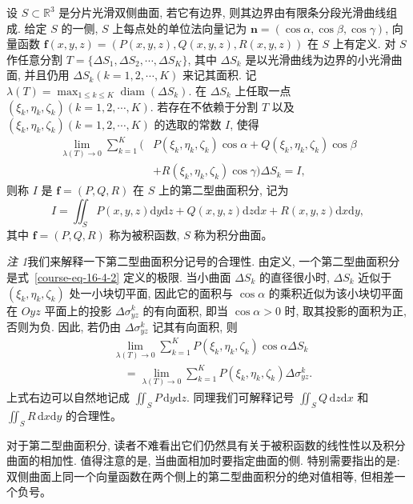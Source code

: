 \documentclass[UTF8,12pt,a4paper,fontset=fandol]{ctexart}
\begin{document}
\begin{definition}\label{course-definition-16-4-2}\quad 设 $S\subset\mathbb R^3$ 是分片光滑双侧曲面, 若它有边界, 则其边界由有限条分段光滑曲线组成. 给定 $S$ 的一侧, $S$ 上每点处的单位法向量记为 $\boldsymbol n=(\cos\alpha,\cos\beta,\cos\gamma)$, 向量函数 $\boldsymbol f(x,y,z)=(P(x,y,z),Q(x,y,z),R(x,y,z))$ 在 $S$ 上有定义. 对 $S$ 作任意分割 $T=\{\Delta S_1,\Delta S_2,\cdots,\Delta S_K\}$, 其中 $\Delta S_k$ 是以光滑曲线为边界的小光滑曲面, 并且仍用 $\Delta S_k(k=1,2,\cdots,K)$ 来记其面积. 记 $\lambda(T)=\max_{1\leqslant k\leqslant K}\operatorname{diam}(\Delta S_k)$. 在 $\Delta S_k$ 上任取一点 $(\xi_k,\eta_k,\zeta_k)(k=1,2,\cdots,K)$. 若存在不依赖于分割 $T$ 以及 $(\xi_k,\eta_k,\zeta_k)(k=1,2,\cdots,K)$ 的选取的常数 $I$, 使得
\begin{equation}
\begin{aligned}
  \lim_{\lambda(T)\to0}\sum_{k=1}^K
  (&P(\xi_k,\eta_k,\zeta_k)\cos\alpha
  +Q(\xi_k,\eta_k,\zeta_k)\cos\beta\\
  &+R(\xi_k,\eta_k,\zeta_k)\cos\gamma)\Delta S_k=I,
\end{aligned}
\label{course-eq-16-4-2}
\end{equation}
则称 $I$ 是 $\boldsymbol f=(P,Q,R)$ 在 $S$ 上的第二型曲面积分, 记为
\[
  I=\iint_S P(x,y,z)\mathrm dy\mathrm dz
    +Q(x,y,z)\mathrm dz\mathrm dx
    +R(x,y,z)\mathrm dx\mathrm dy,
\]
其中 $\boldsymbol f=(P,Q,R)$ 称为被积函数, $S$ 称为积分曲面。

\end{definition}
\noindent\emph{注 1}\quad 我们来解释一下第二型曲面积分记号的合理性. 由定义, 一个第二型曲面积分是式~\eqref{course-eq-16-4-2}  定义的极限. 当小曲面 $\Delta S_k$ 的直径很小时, $\Delta S_k$ 近似于 $(\xi_k,\eta_k,\zeta_k)$ 处一小块切平面, 因此它的面积与 $\cos\alpha$ 的乘积近似为该小块切平面在 $Oyz$ 平面上的投影 $\Delta\sigma^k_{yz}$ 的有向面积, 即当 $\cos\alpha>0$ 时, 取其投影的面积为正, 否则为负. 因此, 若仍由 $\Delta\sigma^k_{yz}$ 记其有向面积, 则
\[
\begin{aligned}
  &\lim_{\lambda(T)\to0}\sum_{k=1}^K
    P(\xi_k,\eta_k,\zeta_k)\cos\alpha\Delta S_k\\
  &\quad=\lim_{\lambda(T)\to0}\sum_{k=1}^K
    P(\xi_k,\eta_k,\zeta_k)\Delta\sigma^k_{yz}.
\end{aligned}
\]
上式右边可以自然地记成 $\iint_S P\,\mathrm dy\mathrm dz$. 同理我们可解释记号 $\iint_S Q\,\mathrm dz\mathrm dx$ 和 $\iint_S R\,\mathrm dx\mathrm dy$ 的合理性。

对于第二型曲面积分, 读者不难看出它们仍然具有关于被积函数的线性性以及积分曲面的相加性. 值得注意的是, 当曲面相加时要指定曲面的侧. 特别需要指出的是: 双侧曲面上同一个向量函数在两个侧上的第二型曲面积分的绝对值相等, 但相差一个负号。
\end{document}
